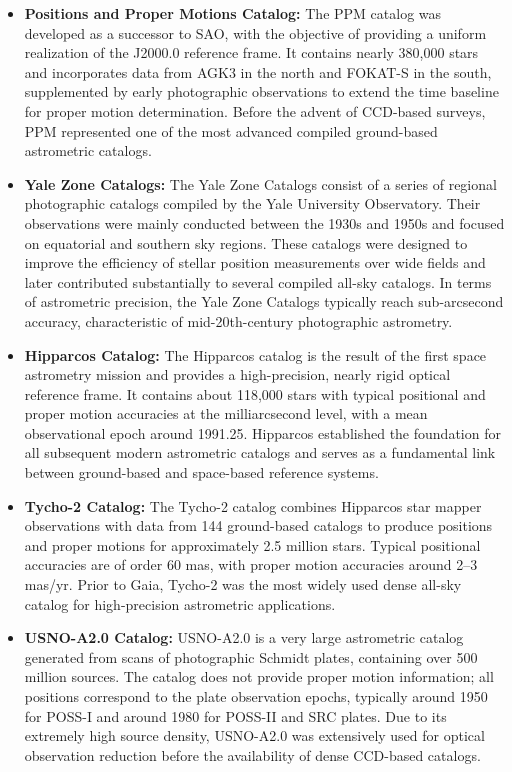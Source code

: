 \documentclass{aastex701}
\begin{document}
\begin{itemize}
    \item \textbf{Positions and Proper Motions Catalog:} \label{subsubsec:ppm} The PPM catalog was developed as a successor to SAO, with the objective of providing a uniform realization of the J2000.0 reference frame. It contains nearly 380,000 stars and incorporates data from AGK3 in the north and FOKAT-S in the south, supplemented by early photographic observations to extend the time baseline for proper motion determination. Before the advent of CCD-based surveys, PPM represented one of the most advanced compiled ground-based astrometric catalogs.

    \item \textbf{Yale Zone Catalogs:} \label{subsubsec:yale} The Yale Zone Catalogs consist of a series of regional photographic catalogs compiled by the Yale University Observatory. Their observations were mainly conducted between the 1930s and 1950s and focused on equatorial and southern sky regions. These catalogs were designed to improve the efficiency of stellar position measurements over wide fields and later contributed substantially to several compiled all-sky catalogs. In terms of astrometric precision, the Yale Zone Catalogs typically reach sub-arcsecond accuracy, characteristic of mid-20th-century photographic astrometry.

    \item \textbf{Hipparcos Catalog:} \label{subsubsec:hipparcos} The Hipparcos catalog is the result of the first space astrometry mission and provides a high-precision, nearly rigid optical reference frame. It contains about 118,000 stars with typical positional and proper motion accuracies at the milliarcsecond level, with a mean observational epoch around 1991.25. Hipparcos established the foundation for all subsequent modern astrometric catalogs and serves as a fundamental link between ground-based and space-based reference systems.

    \item \textbf{Tycho-2 Catalog:} \label{subsubsec:tycho2} The Tycho-2 catalog combines Hipparcos star mapper observations with data from 144 ground-based catalogs to produce positions and proper motions for approximately 2.5 million stars. Typical positional accuracies are of order 60 mas, with proper motion accuracies around 2–3 mas/yr. Prior to Gaia, Tycho-2 was the most widely used dense all-sky catalog for high-precision astrometric applications.

    \item \textbf{USNO-A2.0 Catalog:} \label{subsubsec:usnoa2} USNO-A2.0 is a very large astrometric catalog generated from scans of photographic Schmidt plates, containing over 500 million sources. The catalog does not provide proper motion information; all positions correspond to the plate observation epochs, typically around 1950 for POSS-I and around 1980 for POSS-II and SRC plates. Due to its extremely high source density, USNO-A2.0 was extensively used for optical observation reduction before the availability of dense CCD-based catalogs.


\end{itemize}
\end{document}
